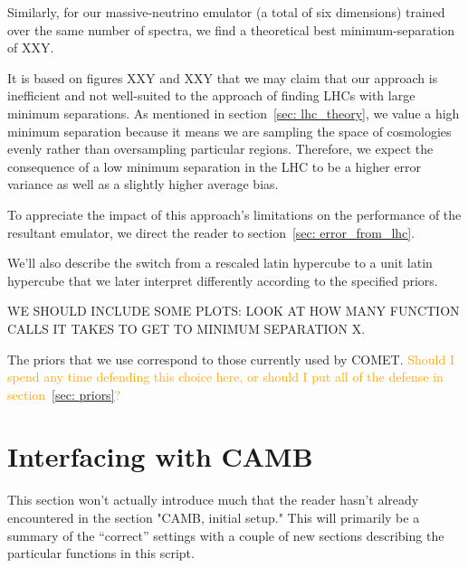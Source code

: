 Similarly, for our massive-neutrino emulator (a total of six dimensions)
trained over the same number of spectra, we find a theoretical best
minimum-separation of XXY. 

It is based on figures XXY and XXY that we may claim that our approach is
inefficient and not well-suited to the approach of finding LHCs with large
minimum separations. As mentioned in section~\ref{sec: lhc_theory},
we value a high minimum separation because it means we are sampling the
space of cosmologies evenly rather than oversampling particular regions.
Therefore, we expect the consequence of a low minimum separation in the LHC to
be a higher error variance as well as a slightly higher average bias.


To appreciate the impact of this approach's limitations on the performance of
the resultant emulator, we direct the reader to
section~\ref{sec: error_from_lhc}.



We'll also describe the switch from a rescaled latin hypercube to a unit latin hypercube that we later interpret differently according to the specified priors.

WE SHOULD INCLUDE SOME PLOTS: LOOK AT HOW MANY FUNCTION CALLS IT TAKES TO GET
TO MINIMUM SEPARATION X.


The priors that we use correspond to those currently used by COMET. \textcolor{orange}{Should I spend any time defending this choice here, or should I put all of the defense in section~\ref{sec: priors}?}

\section{Interfacing with CAMB}


This section won't actually introduce much that the reader hasn't already encountered in the section "CAMB, initial setup." This will primarily be a summary of the ``correct'' settings with a couple of new sections describing the particular functions in this script.

